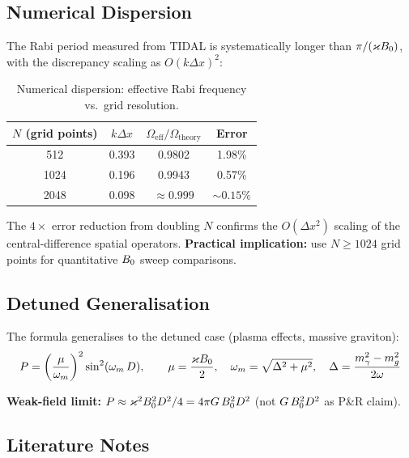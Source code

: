\subsection{Numerical Dispersion}
\label{sec:numerical-dispersion}

The Rabi period measured from TIDAL is systematically longer than $\pi/(\varkappa B_0)$, with the discrepancy scaling as $O(k\Delta x)^2$:

\begin{table}[htbp]
\centering
\caption{Numerical dispersion: effective Rabi frequency vs.\ grid resolution.}
\label{tab:dispersion}
\begin{tabular}{@{}cccc@{}}
\toprule
$N$ (grid points) & $k\Delta x$ & $\Omega_\text{eff}/\Omega_\text{theory}$ & Error \\
\midrule
512  & 0.393 & 0.9802 & 1.98\% \\
1024 & 0.196 & 0.9943 & 0.57\% \\
2048 & 0.098 & $\approx 0.999$ & $\sim 0.15\%$ \\
\bottomrule
\end{tabular}
\end{table}

The $4\times$ error reduction from doubling $N$ confirms the $O(\Delta x^2)$ scaling of the central-difference spatial operators. \textbf{Practical implication:} use $N \geq 1024$ grid points for quantitative $B_0$ sweep comparisons.


\subsection{Detuned Generalisation}

The formula generalises to the detuned case (plasma effects, massive graviton):
\begin{equation}
  P = \left(\frac{\mu}{\omega_m}\right)^2 \sin^2(\omega_m\, D),
  \qquad \mu = \frac{\varkappa B_0}{2}, \quad
  \omega_m = \sqrt{\Delta^2 + \mu^2}, \quad
  \Delta = \frac{m_\gamma^2 - m_g^2}{2\omega}
  \label{eq:detuned}
\end{equation}

\textbf{Weak-field limit:} $P \approx \varkappa^2 B_0^2 D^2 / 4 = 4\pi G\, B_0^2 D^2$ (not $G\,B_0^2 D^2$ as P\&R claim).


\subsection{Literature Notes}
\label{sec:literature-notes}

